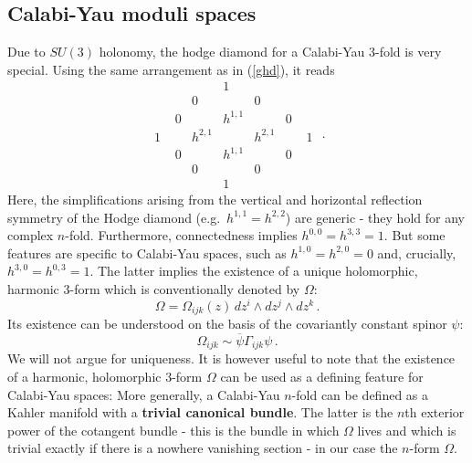\documentclass[12pt]{article}
\newcommand{\be}{\begin{equation}}
\newcommand{\ee}{\end{equation}}
\newcommand{\ol}{\overline}
\numberwithin{equation}{section}
\begin{document}
\subsection{Calabi-Yau moduli spaces}

Due to $SU(3)$ holonomy, the hodge diamond for a Calabi-Yau 3-fold is very special. Using the same arrangement as in (\ref{ghd}), it reads
\be
\begin{array}{ccccccc}
&&&1&&& 
\\ 
&&0&&0&&
\\
&0&&h^{1,1}&&0&
\\
1\,\,&&h^{2,1}&&h^{2,1}&&\,\,1
\\
&0&&h^{1,1}&&0&
\\
&&0&&0&&
\\
&&&1&&& 
\end{array}\,\,.
\ee
Here, the simplifications arising from the vertical and horizontal reflection symmetry of the Hodge diamond (e.g.~$h^{1,1}=h^{2,2}$) are generic - they hold for any complex $n$-fold. Furthermore, connectedness implies $h^{0,0}=h^{3,3}=1$. But some features are specific to Calabi-Yau spaces, such as $h^{1,0}=h^{2,0}=0$ and, crucially, $h^{3,0}=h^{0,3}=1$. The latter implies the existence of a unique holomorphic, harmonic 3-form which is conventionally denoted by $\Omega$:
\be
\Omega=\Omega_{ijk}(z)\,dz^i\wedge dz^j\wedge dz^k\,.
\ee
Its existence can be understood on the basis of the covariantly constant spinor $\psi$:
\be
\Omega_{ijk}\sim\ol{\psi}\Gamma_{ijk}\psi\,.
\ee
We will not argue for uniqueness. It is however useful to note that the existence of a harmonic, holomorphic $3$-form $\Omega$ can be used as a defining feature for Calabi-Yau spaces: More generally, a Calabi-Yau $n$-fold can be defined as a Kahler manifold with a {\bf trivial canonical bundle}. The latter is the $n$th exterior power of the cotangent bundle - this is the bundle in which $\Omega$ lives and which is trivial exactly if there is a nowhere vanishing section - in our case the $n$-form $\Omega$. 
\end{document}
